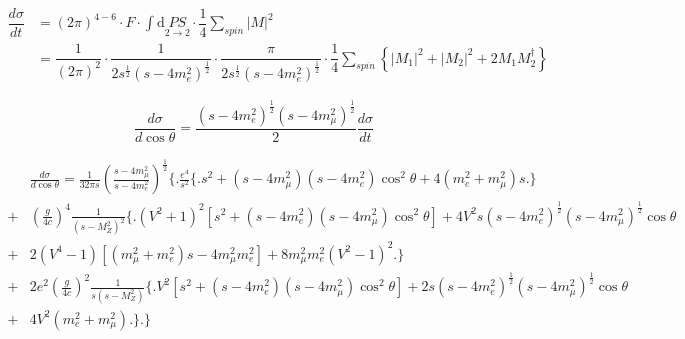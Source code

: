 \documentclass[11pt]{article}
\begin{document}

    \begin{equation}
	\begin{split}
	\dfrac{d\sigma}{dt} & = \left(2\pi\right)^{4-6}\cdot F \cdot \int \mathrm{d}\underset{2\to2}{PS} \cdot \dfrac{1}{4}\sum_{spin}\lvert M\rvert^2 \\ 
	 & = \dfrac{1}{\left(2\pi\right)^{2}} \cdot \dfrac{1}{2s^{\frac{1}{2}}(s-4m_e^2)^{\frac{1}{2}} } \cdot \dfrac{\pi}{2s^{\frac{1}{2}}(s-4m_e^2)^{\frac{1}{2}} } \cdot \dfrac{1}{4}\sum_{spin}\left\{\lvert M_1\rvert^2+\lvert M_2\rvert^2+2 M_1 M_2^{\dagger}\right\}
	\end{split}
	\end{equation}

    \begin{equation}
    \frac{d\sigma}{d\cos\theta}=\frac{(s-4m_e^2)^{\frac{1}{2}}(s-4m_\mu^2)^{\frac{1}{2}}}{2}\frac{d\sigma}{dt}
    \end{equation}

    \begin{equation}
    \begin{split}
    &\frac{d\sigma}{d\cos\theta}=\frac{1}{32\pi s}\left(\frac{s-4m_\mu^2}{s-4m_e^2}\right)^{\frac{1}{2}} \Bigg\{ \Bigg. \frac{e^4}{s^2}\Big\{ \Big. s^2+(s-4m_\mu^2)(s-4m_e^2)\cos^2\theta+4(m_e^2+m_\mu^2)s\Big. \Big\} \\
    +&\left(\frac{g}{4c}\right)^4\frac{1}{(s-M_Z^2)^2}\Big\{ \Big. (V^2+1)^2\left[s^2+(s-4m_e^2)(s-4m_\mu^2)\cos^2\theta\right]+4V^2s(s-4m_e^2)^{\frac{1}{2}}(s-4m_\mu^2)^{\frac{1}{2}}\cos\theta\\
    +&2(V^4-1)\left[(m_\mu^2+m_e^2)s-4m_\mu^2 m_e^2\right]+8m_\mu^2 m_e^2(V^2-1)^2 \Big. \Big\}\\
    +&2e^2\left(\frac{g}{4c}\right)^2\frac{1}{s(s-M_Z^2)}\Big\{ \Big. V^2\left[ s^2+(s-4m_e^2)(s-4m_\mu^2)\cos^2\theta \right]+2s(s-4m_e^2)^{\frac{1}{2}}(s-4m_\mu^2)^{\frac{1}{2}}\cos\theta\\
    +&4V^2(m_e^2+m_\mu^2) \Big. \Big\}
    \Bigg. \Bigg\}
    \end{split}
    \end{equation}


\end{document}
